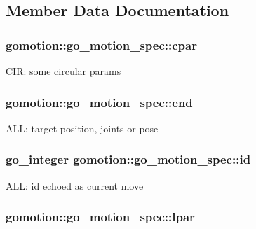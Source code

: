 \subsection{Member Data Documentation}
\hypertarget{structgomotion_1_1go__motion__spec_a4f8c8e620396ab92594d65f1d98bbdcc}{
\subsubsection[{cpar}]{ gomotion\-::go\-\_\-motion\-\_\-spec\-::cpar}}\label{structgomotion_1_1go__motion__spec_a4f8c8e620396ab92594d65f1d98bbdcc}
C\-I\-R\-: some circular params \hypertarget{structgomotion_1_1go__motion__spec_a8e19d2d27bfa3a3c633bae73641f4e45}{
\subsubsection[{end}]{ gomotion\-::go\-\_\-motion\-\_\-spec\-::end}}\label{structgomotion_1_1go__motion__spec_a8e19d2d27bfa3a3c633bae73641f4e45}
A\-L\-L\-: target position, joints or pose \hypertarget{structgomotion_1_1go__motion__spec_a09732ca7aaddfa7a637f171766329931}{
\subsubsection[{id}]{\setlength{\rightskip}{0pt plus 5cm}go\-\_\-integer gomotion\-::go\-\_\-motion\-\_\-spec\-::id}}\label{structgomotion_1_1go__motion__spec_a09732ca7aaddfa7a637f171766329931}
A\-L\-L\-: id echoed as current move \hypertarget{structgomotion_1_1go__motion__spec_a25d35e4638e0dd5721409d02e2f48445}{
\subsubsection[{lpar}]{ gomotion\-::go\-\_\-motion\-\_\-spec\-::lpar}}\label{structgomotion_1_1go__motion__spec_a25d35e4638e0dd5721409d02e2f48445}
